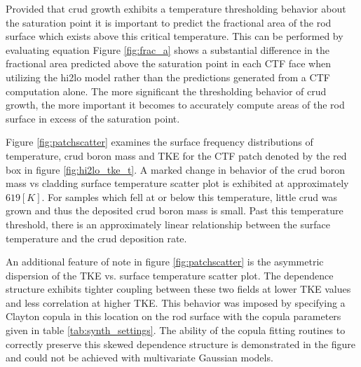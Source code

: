 Provided that crud growth exhibits a temperature thresholding behavior about the saturation point it is important to predict the fractional area of the rod surface which exists above this critical temperature.  This can be performed by evaluating equation %
Figure \ref{fig:frac_a} shows a substantial difference in the fractional area predicted above the saturation point in each CTF face when utilizing the hi2lo model rather than the predictions generated from a CTF computation alone.  The more significant the thresholding behavior of crud growth, the more important it becomes to accurately compute areas of the rod surface in excess of the saturation point.

Figure \ref{fig:patchscatter} examines the surface frequency distributions of temperature, crud boron mass and TKE for the CTF patch denoted by the red box in figure \ref{fig:hi2lo_tke_t}.  A marked change in behavior of the crud boron mass vs cladding surface temperature scatter plot is exhibited at approximately $ 619[K]$.  For samples which fell at or below this temperature, little crud was grown and thus the deposited crud boron mass is small.  Past this temperature threshold, there is an approximately linear relationship between the surface temperature and the crud deposition rate.  

An additional feature of note in figure  \ref{fig:patchscatter} is the asymmetric dispersion of the TKE vs. surface temperature scatter plot.  The dependence structure exhibits tighter coupling between these two fields at lower TKE values and less correlation at higher TKE.  This behavior was imposed by specifying a Clayton copula in this location on the rod surface with the copula parameters given in table \ref{tab:synth_settings}.  The ability of the copula fitting routines to correctly preserve this skewed dependence structure is demonstrated in the figure and could not be achieved with multivariate Gaussian models.

